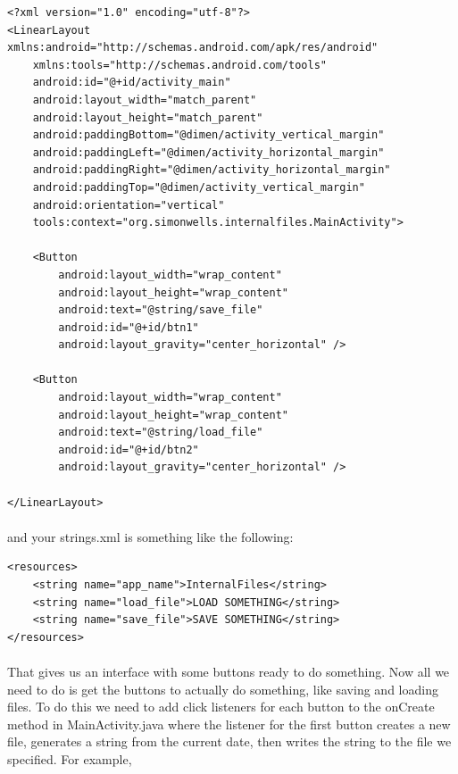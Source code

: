 \begin{lstlisting}
<?xml version="1.0" encoding="utf-8"?>
<LinearLayout xmlns:android="http://schemas.android.com/apk/res/android"
    xmlns:tools="http://schemas.android.com/tools"
    android:id="@+id/activity_main"
    android:layout_width="match_parent"
    android:layout_height="match_parent"
    android:paddingBottom="@dimen/activity_vertical_margin"
    android:paddingLeft="@dimen/activity_horizontal_margin"
    android:paddingRight="@dimen/activity_horizontal_margin"
    android:paddingTop="@dimen/activity_vertical_margin"
    android:orientation="vertical"
    tools:context="org.simonwells.internalfiles.MainActivity">

    <Button
        android:layout_width="wrap_content"
        android:layout_height="wrap_content"
        android:text="@string/save_file"
        android:id="@+id/btn1"
        android:layout_gravity="center_horizontal" />

    <Button
        android:layout_width="wrap_content"
        android:layout_height="wrap_content"
        android:text="@string/load_file"
        android:id="@+id/btn2"
        android:layout_gravity="center_horizontal" />

</LinearLayout>
\end{lstlisting}

\paragraph{} and your strings.xml is something like the following:

\begin{lstlisting}
<resources>
    <string name="app_name">InternalFiles</string>
    <string name="load_file">LOAD SOMETHING</string>
    <string name="save_file">SAVE SOMETHING</string>
</resources>
\end{lstlisting}

\paragraph{} That gives us an interface with some buttons ready to do something. Now all we need to do is get the buttons to actually do something, like saving and loading files. To do this we need to add click listeners for each button to the onCreate method in MainActivity.java where the listener for the first button creates a new file, generates a string from the current date, then writes the string to the file we specified. For example, 

